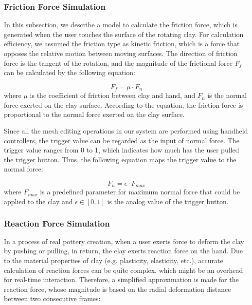\documentclass{svjour3}                     %
\begin{document}
{\color{blue}

\subsubsection{Friction Force Simulation}

In this subsection, we describe a model to calculate the friction force, which is generated when the user touches the surface of the rotating clay.
For calculation efficiency, we assumed the friction type as kinetic friction, which is a force that opposes the relative motion between moving surfaces.
The direction of friction force is the tangent of the rotation, and the magnitude of the frictional force $F_{f}$ can be calculated by the following equation:

\begin{equation}
F_{f} = \mu \cdot F_{n}
\end{equation}
where $\mu$ is the coefficient of friction between clay and hand, and $F_{n}$ is the normal force exerted on the clay surface. According to the equation, the friction force is proportional to the normal force exerted on the clay surface.

Since all the mesh editing operations in our system are performed using handheld controllers, the trigger value can be regarded as the input of normal force.
The trigger value ranges from 0 to 1, which indicates how much has the user pulled the trigger button.
Thus, the following equation maps the trigger value to the normal force:

\begin{equation}
F_{n} = \epsilon \cdot F_{max}
\end{equation}
where $F_{max}$ is a predefined parameter for maximum normal force that could be applied to the clay and $\epsilon \in [0,1]$ is the analog value of the trigger button.


\subsubsection{Reaction Force Simulation}

In a process of real pottery creation, when a user exerts force to deform the clay by pushing or pulling, in return, the clay exerts reaction force on the hand.
%
Due to the material properties of clay (e.g. plasticity, elasticity, etc.), accurate calculation of reaction forces can be quite complex, which might be an overhead for real-time interaction.
Therefore, a simplified approximation is made for the reaction force, whose magnitude is based on the radial deformation distance between two consecutive frames:

}
\end{document}
